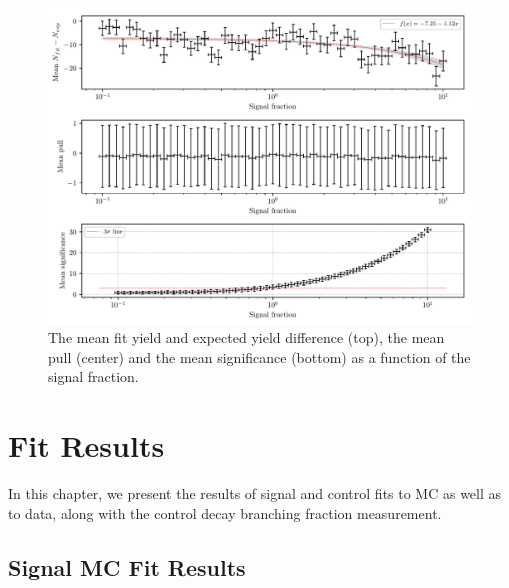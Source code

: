 \begin{figure}[H]
	\centering
	\captionsetup{width=0.8\linewidth}
	\includegraphics[width=\linewidth]{fig/lin_test}
	\caption{The mean fit yield and expected yield difference (top), the mean pull (center) and the mean significance (bottom) as a function of the signal fraction.}
	\label{fig:lin_test}
\end{figure}


\chapter{Fit Results}
\label{sec:fit-results}
In this chapter, we present the results of signal and control fits to MC as well as to data, along with the control decay branching fraction measurement.

\section{Signal MC Fit Results}\label{sec:signal-mc-fit-results}


